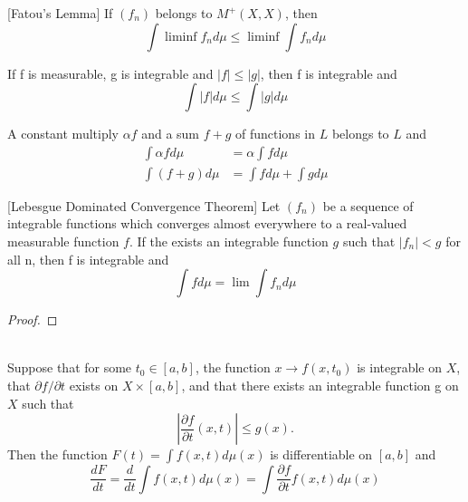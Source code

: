 \begin{lemma}\citep[Thm. 4.8, p.~33]{bartle2014elements}[Fatou's Lemma]
    If $(f_n)$ belongs to $M^{+}(X,X)$, then
    $$
        \int \liminf f_n d\mu \leq \liminf \int f_n d\mu
    $$
\end{lemma}
\begin{corollary}\citep[Thm. 5.4, p.~43]{bartle2014elements}
    If f is measurable, g is integrable and $|f| \leq |g|$, then f is integrable
    and
    $$
        \int |f| d\mu \leq  \int |g| d\mu
    $$
\end{corollary}
\begin{theorem}\citep[Thm. 5.5, p.~43]{bartle2014elements}
    A constant multiply $\alpha f$ and a sum $f + g$ of functions in $L$ belongs
    to $L$ and
    \begin{align*}
         \int \alpha fd\mu &= \alpha \int f d\mu \\
         \int (f + g)d\mu  &= \int fd\mu + \int gd\mu
    \end{align*}
\end{theorem}
\begin{theorem}\citep[Thm. 5.6, p.~44]{bartle2014elements}[Lebesgue Dominated Convergence Theorem]
    Let $(f_n)$ be a sequence of integrable functions which converges almost
    everywhere to a real-valued measurable function $f$. If the exists an 
    integrable function $g$ such that $|f_n| < g$ for all n, then f is integrable
    and
    $$
    \int f d\mu = \lim \int f_n d\mu
    $$
\end{theorem}
\begin{proof}

\end{proof}
\begin{corollary}\citep[Thm. 5.9, p.~46]{bartle2014elements} \\
    Suppose that for some $t_0 \in [a,b]$,  the function $x \rightarrow f(x, t_0)$
    is integrable on $X$, that $\partial f / \partial t$ exists on 
    $X \times [a,b]$, and that there exists an integrable function g on $X$ such 
    that
    $$
        \left|\dfrac{\partial f}{\partial t} (x,t) \right| \leq g(x).
    $$
    Then the function $F(t) = \displaystyle \int f(x,t)d\mu(x)$ is differentiable 
    on $[a,b]$ and
    $$
         \dfrac{dF}{dt} = \dfrac{d }{dt} 
         \int f(x,t)d\mu(x)  = \int \dfrac{\partial f}{\partial t} f(x,t)d\mu(x)
    $$
\end{corollary}
